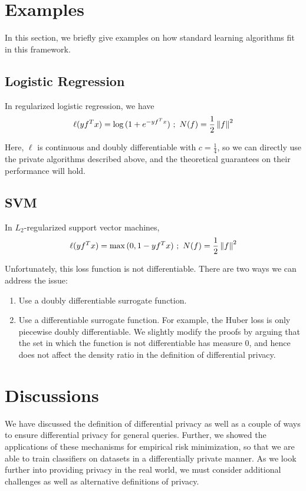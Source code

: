 \documentclass{article} %
\begin{document}
\section{Examples}
In this section, we briefly give examples on how standard learning algorithms fit in this framework.
\subsection{Logistic Regression}
In regularized logistic regression, we have
\begin{align*}
\ell(y f^T x) = \log{(1 + e^{-y f^T x})} ~;~ N(f) = \frac{1}{2} \left\lVert f\right\rVert^2
\end{align*}

Here, $\ell$ is continuous and doubly differentiable with $c = \frac{1}{4}$, so
we can directly use the private algorithms described above, and the theoretical
guarantees on their performance will hold.

\subsection{SVM}
In $L_2$-regularized support vector machines,
\begin{align*}
\ell(y f^T x) = \max{(0, 1 - y f^T x)} ~;~ N(f) = \frac{1}{2} \left\lVert f\right\rVert^2
\end{align*}

Unfortunately, this loss function is not differentiable. There are two ways we
can address the issue:
\begin{enumerate}[label=(\roman*)]
    \item Use a doubly differentiable surrogate function.
    \item Use a differentiable surrogate function.
    For example, the Huber loss is only piecewise doubly differentiable. We slightly modify the proofs by arguing that the set in which the function is not differentiable has measure $0$, and hence does not affect the density ratio in the definition of differential privacy.
\end{enumerate}

\section{Discussions}

We have discussed the definition of differential privacy as well as a couple of
ways to ensure differential privacy for general queries. Further, we showed the
applications of these mechanisms for empirical risk minimization, so that we
are able to train classifiers on datasets in a differentially private manner.
As we look further into providing privacy in the real world, we must consider
additional challenges as well as alternative definitions of privacy.
\end{document}
